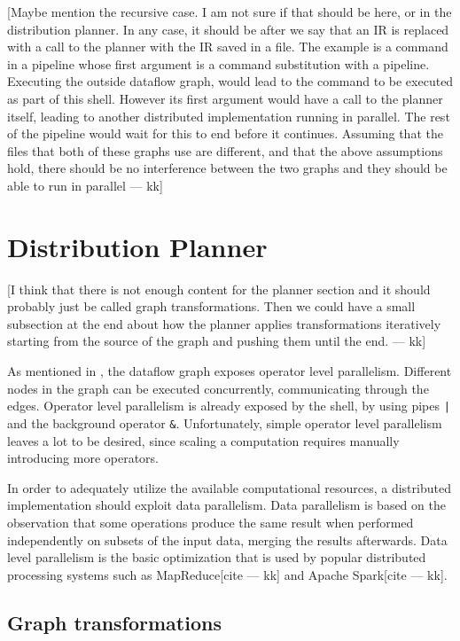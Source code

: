 \documentclass[sigplan,10pt,review,anonymous]{acmart}
\newcommand{\kk}[1]{[{\color{magenta}#1 --- kk}]}
\begin{document}
\kk{Maybe mention the recursive case. I am not sure if that should be
  here, or in the distribution planner. In any case, it should be
  after we say that an IR is replaced with a call to the planner with
  the IR saved in a file. The example is a command in a pipeline whose
  first argument is a command substitution with a pipeline. Executing
  the outside dataflow graph, would lead to the command to be executed
  as part of this shell. However its first argument would have a call
  to the planner itself, leading to another distributed implementation
  running in parallel. The rest of the pipeline would wait for this to
  end before it continues. Assuming that the files that both of these
  graphs use are different, and that the above assumptions hold, there
  should be no interference between the two graphs and they should be
  able to run in parallel}

\section{Distribution Planner}

\kk{I think that there is not enough content for the planner section
  and it should probably just be called graph transformations. Then we
  could have a small subsection at the end about how the planner
  applies transformations iteratively starting from the source of the
  graph and pushing them until the end.}

As mentioned in , the dataflow graph exposes operator level
parallelism. Different nodes in the graph can be executed
concurrently, communicating through the edges. Operator level
parallelism is already exposed by the shell, by using pipes \texttt{|}
and the background operator \texttt{\&}. Unfortunately, simple
operator level parallelism leaves a lot to be desired, since scaling a
computation requires manually introducing more operators.

In order to adequately utilize the available computational resources,
a distributed implementation should exploit data parallelism. Data
parallelism is based on the observation that some operations produce
the same result when performed independently on subsets of the input
data, merging the results afterwards. Data level parallelism is the
basic optimization that is used by popular distributed processing
systems such as MapReduce\kk{cite} and Apache Spark\kk{cite}.

\subsection{Graph transformations}
\end{document}
